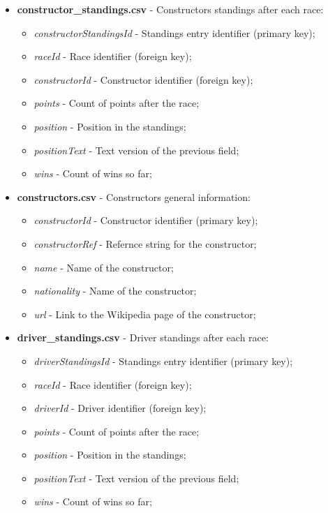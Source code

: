 \documentclass{Configuration_Files/PoliMi3i_thesis}
\begin{document}
\begin{itemize}
    \item \textbf{constructor\_standings.csv} - Constructors standings after each race:
    \begin{itemize}
        \item \textit{constructorStandingsId} - Standings entry identifier (primary key);
        \item \textit{raceId} - Race identifier (foreign key);
        \item \textit{constructorId} - Constructor identifier (foreign key);
        \item \textit{points} - Count of points after the race;
        \item \textit{position} - Position in the standings;
        \item \textit{positionText} - Text version of the previous field;
        \item \textit{wins} - Count of wins so far;
    \end{itemize}

    \item \textbf{constructors.csv} - Constructors general information:
    \begin{itemize}
        \item \textit{constructorId} - Constructor identifier (primary key);
        \item \textit{constructorRef} - Refernce string for the constructor;
        \item \textit{name} - Name of the constructor;
        \item \textit{nationality} - Name of the constructor;
        \item \textit{url} - Link to the Wikipedia page of the constructor;
    \end{itemize}

    \item \textbf{driver\_standings.csv} - Driver standings after each race:
    \begin{itemize}
        \item \textit{driverStandingsId} - Standings entry identifier (primary key);
        \item \textit{raceId} - Race identifier (foreign key);
        \item \textit{driverId} - Driver identifier (foreign key);
        \item \textit{points} - Count of points after the race;
        \item \textit{position} - Position in the standings;
        \item \textit{positionText} - Text version of the previous field;
        \item \textit{wins} - Count of wins so far;
    \end{itemize}


\end{itemize}
\end{document}
